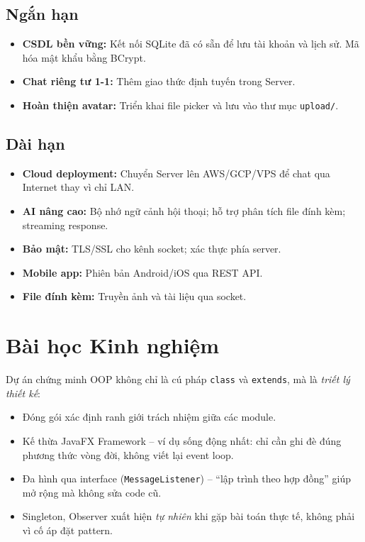 \documentclass[12pt, a4paper, oneside]{report}
\newcommand{\code}[1]{\texttt{\color{hustblue!80!black}#1}}
\begin{document}
\subsection{Ngắn hạn}

\begin{itemize}[leftmargin=2em, itemsep=4pt]
  \item \textbf{CSDL bền vững:} Kết nối SQLite đã có sẵn để lưu tài khoản
    và lịch sử. Mã hóa mật khẩu bằng BCrypt.
  \item \textbf{Chat riêng tư 1-1:} Thêm giao thức định tuyến trong Server.
  \item \textbf{Hoàn thiện avatar:} Triển khai file picker và lưu vào
    thư mục \code{upload/}.
\end{itemize}

\subsection{Dài hạn}

\begin{itemize}[leftmargin=2em, itemsep=4pt]
  \item \textbf{Cloud deployment:} Chuyển Server lên AWS/GCP/VPS để chat
    qua Internet thay vì chỉ LAN.
  \item \textbf{AI nâng cao:} Bộ nhớ ngữ cảnh hội thoại; hỗ trợ phân tích
    file đính kèm; streaming response.
  \item \textbf{Bảo mật:} TLS/SSL cho kênh socket; xác thực phía server.
  \item \textbf{Mobile app:} Phiên bản Android/iOS qua REST API.
  \item \textbf{File đính kèm:} Truyền ảnh và tài liệu qua socket.
\end{itemize}

\section{Bài học Kinh nghiệm}

\begin{tcolorbox}[infostyle, title={Kiến thức OOP đã vận dụng}]
Dự án chứng minh OOP không chỉ là cú pháp \code{class} và \code{extends},
mà là \textit{triết lý thiết kế}:
\begin{itemize}[leftmargin=1.5em, itemsep=4pt, topsep=4pt]
  \item Đóng gói xác định ranh giới trách nhiệm giữa các module.
  \item Kế thừa JavaFX Framework -- ví dụ sống động nhất: chỉ cần ghi
    đè đúng phương thức vòng đời, không viết lại event loop.
  \item Đa hình qua interface (\code{MessageListener}) -- ``lập trình theo
    hợp đồng'' giúp mở rộng mà không sửa code cũ.
  \item Singleton, Observer xuất hiện \textit{tự nhiên} khi gặp bài toán
    thực tế, không phải vì cố áp đặt pattern.
\end{itemize}
\end{tcolorbox}
\end{document}

